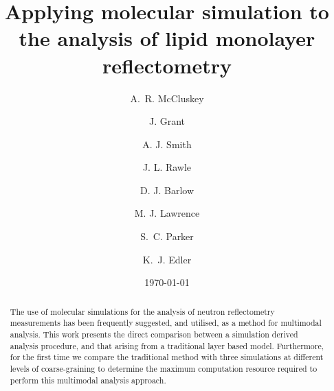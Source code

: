 \documentclass[amsmath,amssymb,twocolumn,superscriptaddress,aps,prl]{revtex4-1}
\begin{document}

\title{Applying molecular simulation to the analysis of lipid monolayer reflectometry}

\author{A.~R. McCluskey}

\author{J. Grant}

\author{A. J. Smith}

\author{J. L. Rawle}

\author{D. J. Barlow}

\author{M. J. Lawrence}

\author{S.~C. Parker}

\author{K.~J. Edler}

\date{\today}

\begin{abstract}
The use of molecular simulations for the analysis of neutron reflectometry measurements has been frequently suggested, and utilised, as a method for multimodal analysis.
This work presents the direct comparison between a simulation derived analysis procedure, and that arising from a traditional layer based model.
Furthermore, for the first time we compare the traditional method with three simulations at different levels of coarse-graining to determine the maximum computation resource required to perform this multimodal analysis approach.
\end{abstract}

\maketitle                        %
\end{document}
